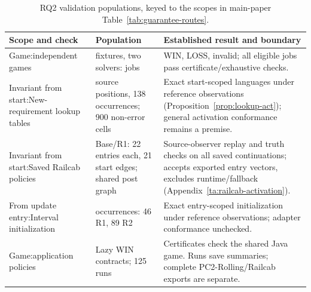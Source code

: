 \begin{table}[!htbp]
\caption{RQ2 validation populations, keyed to the scopes in main-paper Table~\ref{tab:guarantee-routes}.}
\label{tab:validation-populations}
\centering\small
\begin{tabular}{@{}>{\raggedright\arraybackslash}p{.21\linewidth}>{\raggedright\arraybackslash}p{.30\linewidth}>{\raggedright\arraybackslash}p{.43\linewidth}@{}}\toprule
Scope and check & Population & Established result and boundary\\\midrule
Game:\newline independent games & \FixedRQOneFixtures{} fixtures, two solvers: \FixedRQOneJobs{} jobs & \FixedRQOneWin{} WIN, \FixedRQOneLoss{} LOSS, \FixedRQOneInvalid{} invalid; all \FixedRQOneEligible{} eligible jobs pass certificate/exhaustive checks.\\\addlinespace
Invariant from start:\newline New-requirement lookup tables & 46 source positions, 138 occurrences; 900 non-error cells & Exact start-scoped languages under reference observations (Proposition~\ref{prop:lookup-act}); general activation conformance remains a premise.\\\addlinespace
Invariant from start:\newline Saved Railcab policies & Base/R1: 22 entries each, 21 start edges; shared post graph & Source-observer replay and truth checks on all saved continuations; accepts exported entry vectors, excludes runtime/fallback (Appendix~\ref{ta:railcab-activation}).\\\addlinespace
From update entry:\newline Interval initialization & \VThreeRSUpdExact{} occurrences: 46 R1, 89 R2 & Exact entry-scoped initialization under reference observations; adapter conformance unchecked.\\\addlinespace
Game:\newline application policies & \FixedPolicies{} Lazy WIN contracts; 125 runs & Certificates check the shared Java game. Runs save summaries; complete PC2-Rolling/Railcab exports are separate.\\\bottomrule
\end{tabular}
\end{table}
